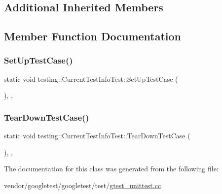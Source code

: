 \subsection*{Additional Inherited Members}


\subsection{Member Function Documentation}
\mbox{\label{classtesting_1_1_current_test_info_test_a61bad7ce29923afd464daf9684b6269e}} 
\subsubsection{\texorpdfstring{Set\+Up\+Test\+Case()}{SetUpTestCase()}}
{\footnotesize\ttfamily static void testing\+::\+Current\+Test\+Info\+Test\+::\+Set\+Up\+Test\+Case (\begin{DoxyParamCaption}{ }\end{DoxyParamCaption})\hspace{0.3cm}{\ttfamily [inline]}, {\ttfamily [static]}, {\ttfamily [protected]}}

\mbox{\label{classtesting_1_1_current_test_info_test_a9a80a5a3e6e70c619870c2ae9df892a6}} 
\subsubsection{\texorpdfstring{Tear\+Down\+Test\+Case()}{TearDownTestCase()}}
{\footnotesize\ttfamily static void testing\+::\+Current\+Test\+Info\+Test\+::\+Tear\+Down\+Test\+Case (\begin{DoxyParamCaption}{ }\end{DoxyParamCaption})\hspace{0.3cm}{\ttfamily [inline]}, {\ttfamily [static]}, {\ttfamily [protected]}}



The documentation for this class was generated from the following file\+:\begin{DoxyCompactItemize}
\item 
vendor/googletest/googletest/test/\hyperlink{gtest__unittest_8cc}{gtest\+\_\+unittest.\+cc}\end{DoxyCompactItemize}
